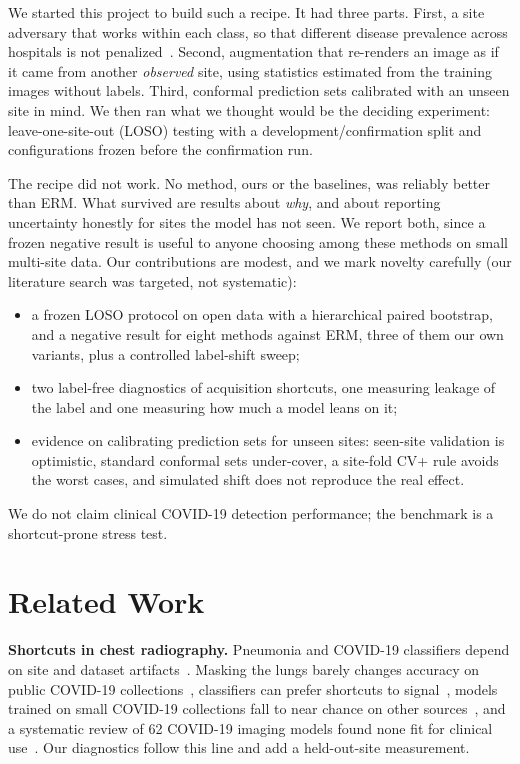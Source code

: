 \documentclass[10pt]{article}
\newcommand{\erm}{ERM}
\begin{document}
We started this project to build such a recipe. It had three parts. First, a site adversary that works within each class, so that different disease prevalence across hospitals is not penalized~\cite{zhao2019learning}. Second, augmentation that re-renders an image as if it came from another \emph{observed} site, using statistics estimated from the training images without labels. Third, conformal prediction sets calibrated with an unseen site in mind. We then ran what we thought would be the deciding experiment: leave-one-site-out (LOSO) testing with a development/confirmation split and configurations frozen before the confirmation run.

The recipe did not work. No method, ours or the baselines, was reliably better than \erm{}. What survived are results about \emph{why}, and about reporting uncertainty honestly for sites the model has not seen. We report both, since a frozen negative result is useful to anyone choosing among these methods on small multi-site data. Our contributions are modest, and we mark novelty carefully (our literature search was targeted, not systematic):
\begin{itemize}\setlength\itemsep{0pt}
  \item a frozen LOSO protocol on open data with a hierarchical paired bootstrap, and a negative result for eight methods against ERM, three of them our own variants, plus a controlled label-shift sweep;
  \item two label-free diagnostics of acquisition shortcuts, one measuring leakage of the label and one measuring how much a model leans on it;
  \item evidence on calibrating prediction sets for unseen sites: seen-site validation is optimistic, standard conformal sets under-cover, a site-fold CV+ rule avoids the worst cases, and simulated shift does not reproduce the real effect.
\end{itemize}
We do not claim clinical COVID-19 detection performance; the benchmark is a shortcut-prone stress test.

\section{Related Work}
\textbf{Shortcuts in chest radiography.} Pneumonia and COVID-19 classifiers depend on site and dataset artifacts~\cite{zech2018variable,pooch2020can}. Masking the lungs barely changes accuracy on public COVID-19 collections~\cite{maguolo2021critic}, classifiers can prefer shortcuts to signal~\cite{degrave2021ai}, models trained on small COVID-19 collections fall to near chance on other sources~\cite{tartaglione2020unveiling}, and a systematic review of 62 COVID-19 imaging models found none fit for clinical use~\cite{roberts2021common}. Our diagnostics follow this line and add a held-out-site measurement.
\end{document}
